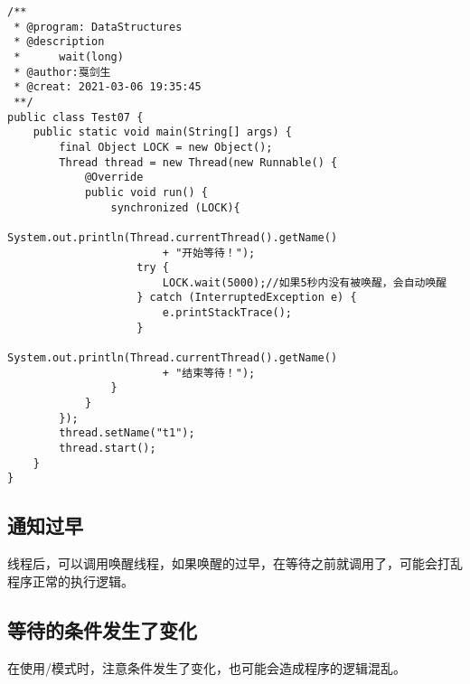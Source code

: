 \documentclass[a4paper]{report}
\begin{document}
\begin{Verbatim}[frame=single,numbersep=5pt,xleftmargin=1.5em,xrightmargin=1.5em]
/**
 * @program: DataStructures
 * @description
 *      wait(long)
 * @author:戛剑生
 * @creat: 2021-03-06 19:35:45
 **/
public class Test07 {
    public static void main(String[] args) {
        final Object LOCK = new Object();
        Thread thread = new Thread(new Runnable() {
            @Override
            public void run() {
                synchronized (LOCK){
                    System.out.println(Thread.currentThread().getName() 
                        + "开始等待！");
                    try {
                        LOCK.wait(5000);//如果5秒内没有被唤醒，会自动唤醒
                    } catch (InterruptedException e) {
                        e.printStackTrace();
                    }
                    System.out.println(Thread.currentThread().getName() 
                        + "结束等待！");
                }
            }
        });
        thread.setName("t1");
        thread.start();
    }
}
\end{Verbatim}
\subsection{通知过早}
线程后，可以调用唤醒线程，如果唤醒的过早，在等待之前就调用了，可能会打乱程序正常的执行逻辑。
\subsection{等待的条件发生了变化}
在使用/模式时，注意条件发生了变化，也可能会造成程序的逻辑混乱。
\end{document}
